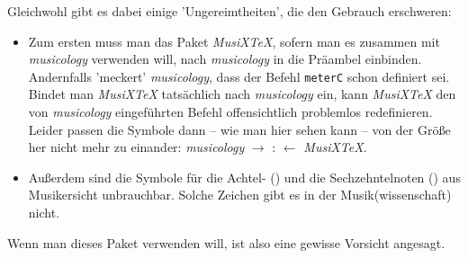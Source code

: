 Gleichwohl gibt es dabei einige 'Ungereimtheiten', die den Gebrauch erschweren:
\begin{itemize}
  \item Zum ersten muss man das Paket \textit{MusiX\TeX}, sofern man es zusammen
  mit \textit{musicology} verwenden will, nach \textit{musicology} in die Präambel
  einbinden. Andernfalls 'meckert' \textit{musicology}, dass der Befehl
  \texttt{meterC} schon definiert sei. Bindet man \textit{MusiX\TeX} tatsächlich
  nach \textit{musicology} ein, kann \textit{MusiX\TeX} den von \textit{musicology}
  eingeführten Befehl offensichtlich problemlos redefinieren. Leider passen die
  Symbole dann -- wie man hier sehen kann -- von der Größe her nicht mehr zu
  einander: \textit{musicology} $\rightarrow$ \meterCutC : \meterC $\leftarrow$
  \textit{MusiX\TeX}.
  \item Außerdem sind die Symbole für die Achtel- (\musEighth) und die
  Sechzehntelnoten (\musSixteenth) aus Musikersicht unbrauchbar. Solche Zeichen
  gibt es in der Musik(wissenschaft) nicht.
\end{itemize}

Wenn man dieses Paket verwenden will, ist also eine gewisse Vorsicht angesagt.


%
